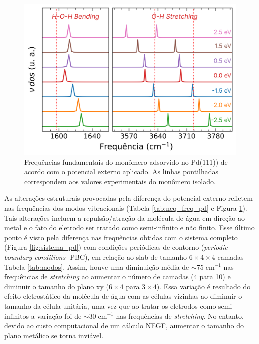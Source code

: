 \begin{figure}[h!]
	\centering
	\caption{Frequências fundamentais do monômero adsorvido no Pd(111)) de acordo com o potencial externo aplicado. As linhas pontilhadas correspondem aos valores experimentais do monômero isolado.}
	\label{fig:neq_pd_mon_freq}
	\includegraphics[scale=0.08]{figs/freq_monomer_pd.png}
\end{figure}

As alterações estruturais provocadas pela diferença do potencial externo refletem nas frequências dos modos vibracionais (Tabela \ref{tab:neq_freq_pd} e Figura \ref{fig:neq_pd_mon_freq}). Tais alterações incluem a repulsão/atração da molécula de água em direção ao metal e o fato do eletrodo ser tratado como semi-infinito e não finito. Esse último ponto é visto pela diferença nas frequências obtidas com o sistema completo (Figura \ref{fig:sistema_pd}) com condições periódicas de contorno (\textit{periodic boundary conditions}- PBC), em relação ao slab de tamanho $ 6\times4\times4 $ camadas -- Tabela \ref{tab:modos}. Assim, houve uma diminuição média de $ \sim 75\;\si{\cm}^{-1} $ nas frequências de \textit{stretching} ao aumentar o número de camadas (4 para 10) e diminuir o tamanho do plano xy ($ 6\times4 $ para $ 3\times4 $). Essa variação é resultado do efeito eletrostático da molécula de água com as células vizinhas ao diminuir o tamanho da célula unitária, uma vez que ao tratar os eletrodos como semi-infinitos a variação foi de $ \sim 30\;\si{\cm}^{-1} $ nas frequências de \textit{stretching}. No entanto, devido ao custo computacional de um cálculo NEGF, aumentar o tamanho do plano metálico se torna inviável.  


